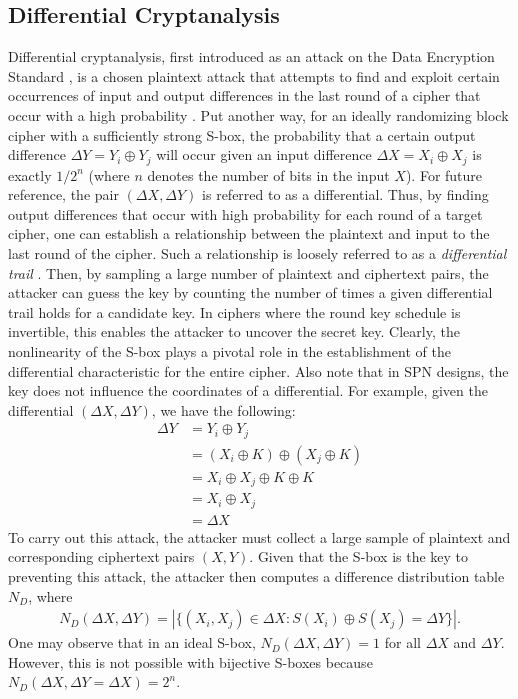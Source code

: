 \subsection{Differential Cryptanalysis}
Differential cryptanalysis, first introduced as an attack on the Data Encryption Standard \cite{Biham91-1}, is a chosen plaintext attack that attempts to find and exploit certain occurrences of input and output differences in the last round of a cipher that occur with a high probability \cite{stinson-crypto}. Put another way, for an ideally randomizing block cipher with a sufficiently strong S-box, the probability that a certain output difference $\Delta Y = Y_i \oplus  Y_j$ will occur given an input difference $\Delta X = X_i \oplus X_j$ is exactly $1/2^n$ (where $n$ denotes the number of bits in the input $X$). For future reference, the pair $(\Delta X, \Delta Y)$ is referred to as a differential. Thus, by finding output differences that occur with high probability for each round of a target cipher, one can establish a relationship between the plaintext and input to the last round of the cipher. Such a relationship is loosely referred to as a \emph{differential trail} \cite{Daemen02-1}. Then, by sampling a large number of plaintext and ciphertext pairs, the attacker can guess the key by counting the number of times a given differential trail holds for a candidate key. In ciphers where the round key schedule is invertible, this enables the attacker to uncover the secret key. Clearly, the nonlinearity of the S-box plays a pivotal role in the establishment of the differential characteristic for the entire cipher. Also note that in SPN designs, the key does not influence the coordinates of a differential. For example, given the differential $(\Delta X, \Delta Y)$, we have the following:
\begin{align*}
\Delta Y & = Y_i \oplus Y_j \\
& =  (X_i \oplus K) \oplus (X_j \oplus K) \\
& =  X_i \oplus X_j \oplus K \oplus K \\
& =  X_i \oplus X_j \\
& = \Delta X
\end{align*} 
To carry out this attack, the attacker must collect a large sample of plaintext and corresponding ciphertext pairs $(X,Y)$. Given that the S-box is the key to preventing this attack, the attacker then computes a difference distribution table $N_D$, where
\begin{align*}
N_D(\Delta X, \Delta Y) = |\{(X_i, X_j) \in \Delta X : S(X_i) \oplus S(X_j) = \Delta Y\}|.
\end{align*}
One may observe that in an ideal S-box, $N_D(\Delta X, \Delta Y) = 1$ for all $\Delta X$ and $\Delta Y$. However, this is not possible with bijective S-boxes because $N_D(\Delta X, \Delta Y = \Delta X) = 2^n$. 

